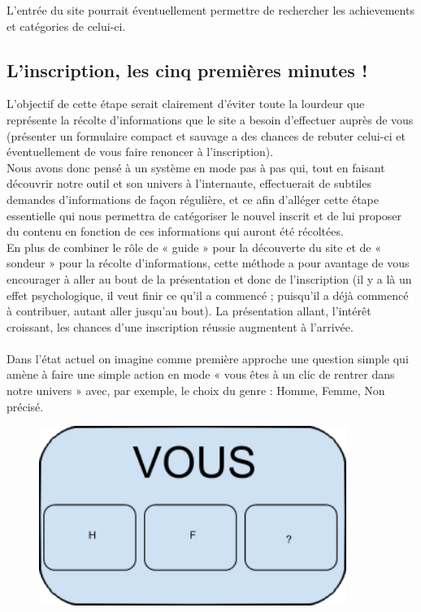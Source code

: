 \documentclass{life-fr}
\begin{document}
L'entrée du site pourrait éventuellement permettre de rechercher les achievements et catégories de celui-ci.

\newpage

\subsection{L'inscription, les cinq premières minutes !}

L'objectif de cette étape serait clairement d'éviter toute la lourdeur que représente la récolte d'informations que le site a besoin d'effectuer auprès de vous
(présenter un formulaire compact et sauvage a des chances de rebuter celui-ci et éventuellement de vous faire renoncer à l'inscription).\\

Nous avons donc pensé à un système en mode pas à pas qui, tout en faisant découvrir notre outil et son univers à l'internaute, effectuerait de subtiles demandes d'informations de façon régulière, et ce afin d'alléger cette étape essentielle qui nous permettra de catégoriser le nouvel inscrit et de lui proposer du contenu en fonction de ces informations qui auront été récoltées.\\

En plus de combiner le rôle de « guide » pour la découverte du site et de « sondeur » pour la récolte d'informations, cette méthode a pour avantage de vous encourager à aller au bout de la présentation et donc de l'inscription (il y a là un effet psychologique, il veut finir ce qu'il a commencé ; puisqu'il a déjà commencé à contribuer, autant aller jusqu'au bout). La présentation allant, l'intérêt croissant, les chances d'une inscription réussie augmentent à l'arrivée.\\
\\

Dans l'état actuel on imagine comme première approche une question simple qui amène à faire une simple action en mode « vous êtes à un clic de rentrer dans notre univers » avec, par exemple, le choix du genre : Homme, Femme, Non précisé.

\begin{figure}[H]
	\begin{center}
		\includegraphics[width=10cm]{img/vous.png}
	\end{center}
\end{figure}
\end{document}
